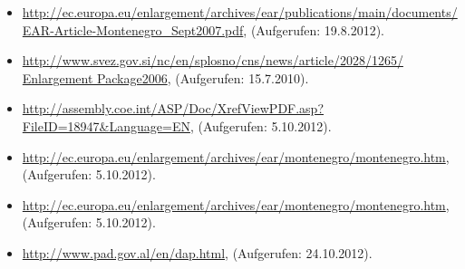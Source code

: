 \begin{itemize}[label={},leftmargin=*,itemsep=0pt]
\item\url{http://ec.europa.eu/enlargement/archives/ear/publications/main/documents/
EAR-Article-Montenegro_Sept2007.pdf}, (Aufgerufen: 19.8.2012).
\item\url{http://www.svez.gov.si/nc/en/splosno/cns/news/article/2028/1265/ Enlargement Package2006}, (Aufgerufen: 15.7.2010).
\item\url{http://assembly.coe.int/ASP/Doc/XrefViewPDF.asp?FileID=18947&Language=EN}, (Aufgerufen: 5.10.2012).
\item\url{http://ec.europa.eu/enlargement/archives/ear/montenegro/montenegro.htm}, (Aufgerufen: 5.10.2012).
\item\url{http://ec.europa.eu/enlargement/archives/ear/montenegro/montenegro.htm}, (Aufgerufen: 5.10.2012).
\item\url{http://www.pad.gov.al/en/dap.html}, (Aufgerufen: 24.10.2012).
\end{itemize}
